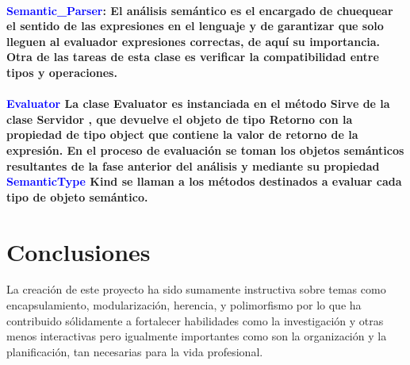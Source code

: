 \documentclass[a4paper, 12pt]{article}
\begin{document}
\paragraph{\textcolor{blue}{Semantic\_Parser}: El análisis semántico es el encargado de chuequear el sentido de las expresiones en el lenguaje y de garantizar que solo lleguen al evaluador expresiones correctas, de aquí su importancia. Otra de las tareas de esta clase es verificar la compatibilidad entre tipos y operaciones.}\label{}
\paragraph{\textcolor{blue}{Evaluator} La clase Evaluator es instanciada en el método Sirve de la clase Servidor , que devuelve el objeto de tipo Retorno con la propiedad de tipo object que contiene la valor de retorno de la expresión. En el proceso de evaluación se toman los objetos semánticos resultantes de la fase anterior del análisis y mediante su propiedad \textcolor{blue}{SemanticType} Kind se llaman a los métodos destinados a evaluar cada tipo de objeto semántico.}\label{}




\newpage

\section{Conclusiones}\label{sec:concl}
La creación de este proyecto ha sido sumamente instructiva sobre temas como encapsulamiento, modularización, herencia, y polimorfismo por lo que  ha contribuido sólidamente a fortalecer habilidades como la investigación y otras menos interactivas pero igualmente importantes como son la organización y la planificación, tan necesarias para la vida profesional.
\end{document}
